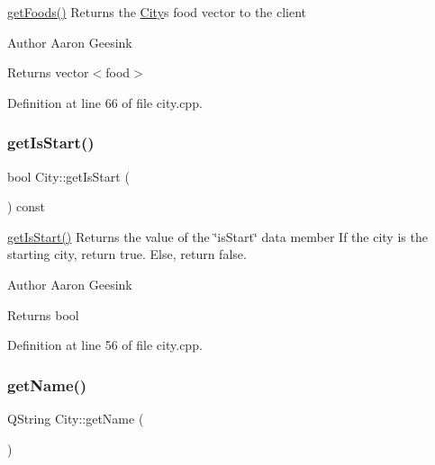 \mbox{\hyperlink{class_city_abbfdb9d3dba484ee8f9daee6ef03cd97}{get\+Foods()}} Returns the \mbox{\hyperlink{class_city}{City}}\textquotesingle{}s food vector to the client 

\begin{DoxyAuthor}{Author}
Aaron Geesink 
\end{DoxyAuthor}
\begin{DoxyReturn}{Returns}
vector$<$food$>$ 
\end{DoxyReturn}


Definition at line 66 of file city.\+cpp.

\mbox{\label{class_city_ae817fa08cc2191da09c91c3d6b4069d5}} 
\subsubsection{\texorpdfstring{getIsStart()}{getIsStart()}}
{\footnotesize\ttfamily bool City\+::get\+Is\+Start (\begin{DoxyParamCaption}{ }\end{DoxyParamCaption}) const}



\mbox{\hyperlink{class_city_ae817fa08cc2191da09c91c3d6b4069d5}{get\+Is\+Start()}} Returns the value of the \char`\"{}is\+Start\char`\"{} data member If the city is the starting city, return true. Else, return false. 

\begin{DoxyAuthor}{Author}
Aaron Geesink 
\end{DoxyAuthor}
\begin{DoxyReturn}{Returns}
bool 
\end{DoxyReturn}


Definition at line 56 of file city.\+cpp.

\mbox{\label{class_city_afe733410d61155d8a4013293b0b72408}} 
\subsubsection{\texorpdfstring{getName()}{getName()}\hspace{0.1cm}{\footnotesize\ttfamily [1/2]}}
{\footnotesize\ttfamily Q\+String City\+::get\+Name (\begin{DoxyParamCaption}{ }\end{DoxyParamCaption})}



